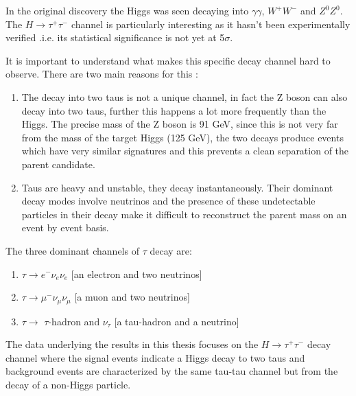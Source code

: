 In the original discovery the Higgs was seen decaying into $\gamma\gamma$, $W^{+}W^{-}$ and $Z^{0}Z^{0}$. The $H \rightarrow \tau^{+} \tau^{-}$ channel is particularly interesting as it hasn't been experimentally verified .i.e. its statistical significance is not yet at 5$\sigma$. 

It is important to understand what makes this specific decay channel hard to observe. There are two main reasons for this :

\begin{enumerate}

\item The decay into two taus is not a unique channel, in fact the Z boson can also decay into two taus, further this happens a lot more frequently than the Higgs. The precise mass of the Z boson is 91 GeV, since this is not very far from the mass of the target Higgs (125 GeV), the two decays produce events which have very similar signatures and this prevents a clean separation of the parent candidate.

\item Taus are heavy and unstable, they decay instantaneously. Their dominant decay modes involve neutrinos and the presence of these undetectable particles in their decay make it difficult to reconstruct the parent mass on an event by event basis.
\end{enumerate}

The three dominant channels of $\tau$ decay are: 
\begin{enumerate}[noitemsep]
\item{$\tau \rightarrow e^{-}\nu_{e}\nu_{e}$} [an electron and two neutrinos]
\item{$\tau \rightarrow \mu^{-}\nu_{\mu}\nu_{\mu}$} [a muon and two neutrinos]
\item{$\tau \rightarrow$  $\tau$-hadron and $\nu_{\tau}$ [a tau-hadron and a neutrino]}
\end{enumerate} 
The data underlying the results in this thesis focuses on the $H \rightarrow \tau^{+} \tau^{-}$ decay channel where the signal events indicate a Higgs decay to two taus and background events are characterized by the same tau-tau channel but from the decay of a non-Higgs particle.

